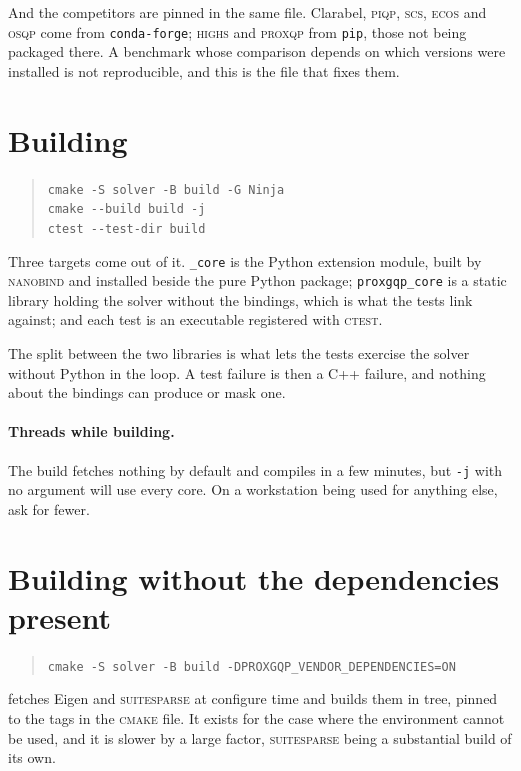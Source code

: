 \documentclass[a4paper,11pt]{book}
\theoremstyle{plain}
\theoremstyle{definition}
\theoremstyle{remark}
\numberwithin{equation}{chapter}
\numberwithin{algorithm}{chapter}
\begin{document}
	And the competitors are pinned in the same file. Clarabel, \textsc{piqp},
	\textsc{scs}, \textsc{ecos} and \textsc{osqp} come from
	\texttt{conda-forge}; \textsc{highs} and \textsc{proxqp} from \texttt{pip},
	those not being packaged there. A benchmark whose comparison depends on which
	versions were installed is not reproducible, and this is the file that fixes
	them.

	\section{Building}

	\begin{quote}
		\texttt{cmake -S solver -B build -G Ninja}\\
		\texttt{cmake -{}-build build -j}\\
		\texttt{ctest -{}-test-dir build}
	\end{quote}

	Three targets come out of it. \texttt{\_core} is the Python extension module,
	built by \textsc{nanobind} and installed beside the pure Python package;
	\texttt{proxgqp\_core} is a static library holding the solver without the
	bindings, which is what the tests link against; and each test is an executable
	registered with \textsc{ctest}.

	The split between the two libraries is what lets the tests exercise the solver
	without Python in the loop. A test failure is then a C++ failure, and nothing
	about the bindings can produce or mask one.

	\paragraph{Threads while building.}
	The build fetches nothing by default and compiles in a few minutes, but
	\texttt{-j} with no argument will use every core. On a workstation being used
	for anything else, ask for fewer.

	\section{Building without the dependencies present}

	\begin{quote}
		\texttt{cmake -S solver -B build -DPROXGQP\_VENDOR\_DEPENDENCIES=ON}
	\end{quote}

	fetches Eigen and \textsc{suitesparse} at configure time and builds them in
	tree, pinned to the tags in the \textsc{cmake} file. It exists for the case
	where the environment cannot be used, and it is slower by a large factor,
	\textsc{suitesparse} being a substantial build of its own.
\end{document}
